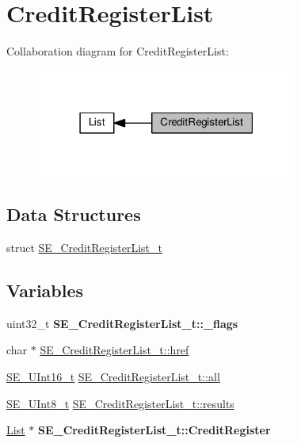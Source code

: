 \hypertarget{group__CreditRegisterList}{}\section{Credit\+Register\+List}
\label{group__CreditRegisterList}
Collaboration diagram for Credit\+Register\+List\+:\nopagebreak
\begin{figure}[H]
\begin{center}
\leavevmode
\includegraphics[width=243pt]{group__CreditRegisterList}
\end{center}
\end{figure}
\subsection*{Data Structures}
\begin{DoxyCompactItemize}
\item 
struct \hyperlink{structSE__CreditRegisterList__t}{S\+E\+\_\+\+Credit\+Register\+List\+\_\+t}
\end{DoxyCompactItemize}
\subsection*{Variables}
\begin{DoxyCompactItemize}
\item 
\mbox{\label{group__CreditRegisterList_gad54eeaf6abd546e0582bee1dec042a66}} 
uint32\+\_\+t {\bfseries S\+E\+\_\+\+Credit\+Register\+List\+\_\+t\+::\+\_\+flags}
\item 
char $\ast$ \hyperlink{group__CreditRegisterList_gabc831c1d07e49cfadf9af91ea5ebf19d}{S\+E\+\_\+\+Credit\+Register\+List\+\_\+t\+::href}
\item 
\hyperlink{group__UInt16_gac68d541f189538bfd30cfaa712d20d29}{S\+E\+\_\+\+U\+Int16\+\_\+t} \hyperlink{group__CreditRegisterList_gab1223b63def7d1d4811bc32c4addf18d}{S\+E\+\_\+\+Credit\+Register\+List\+\_\+t\+::all}
\item 
\hyperlink{group__UInt8_gaf7c365a1acfe204e3a67c16ed44572f5}{S\+E\+\_\+\+U\+Int8\+\_\+t} \hyperlink{group__CreditRegisterList_ga4ca66cecce8ebdd10c6e4fc24350ad3c}{S\+E\+\_\+\+Credit\+Register\+List\+\_\+t\+::results}
\item 
\mbox{\label{group__CreditRegisterList_gaead8902a07d2a0d93b15946c7bada153}} 
\hyperlink{structList}{List} $\ast$ {\bfseries S\+E\+\_\+\+Credit\+Register\+List\+\_\+t\+::\+Credit\+Register}
\end{DoxyCompactItemize}


